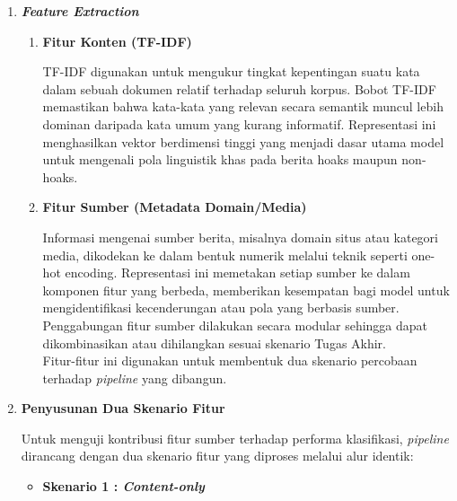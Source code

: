 \begin{enumerate}
\begin{itemize}
        \item \textbf{Stemming}, yang mengembalikan kata ke bentuk dasarnya untuk menyatukan variasi morfologis, misalnya “menyebarkan”, “disebarkan”, dan “penyebaran” menjadi bentuk dasar “sebar”.

        Proses ini bertujuan menghasilkan representasi teks yang bersih dan dapat diproses lebih lanjut oleh model.\\

    \end{itemize}

    \item \textbf{\textit{Feature Extraction}}
        \begin{enumerate}
            \item \textbf{Fitur Konten (TF-IDF)}
            
            TF-IDF digunakan untuk mengukur tingkat kepentingan suatu kata dalam sebuah dokumen relatif terhadap seluruh korpus. Bobot TF-IDF memastikan bahwa kata-kata yang relevan secara semantik muncul lebih dominan daripada kata umum yang kurang informatif. Representasi ini menghasilkan vektor berdimensi tinggi yang menjadi dasar utama model untuk mengenali pola linguistik khas pada berita hoaks maupun non-hoaks.
            
            \item \textbf{Fitur Sumber (Metadata Domain/Media)}
            
            Informasi mengenai sumber berita, misalnya domain situs atau kategori media, dikodekan ke dalam bentuk numerik melalui teknik seperti one-hot encoding. Representasi ini memetakan setiap sumber ke dalam komponen fitur yang berbeda, memberikan kesempatan bagi model untuk mengidentifikasi kecenderungan atau pola yang berbasis sumber. Penggabungan fitur sumber dilakukan secara modular sehingga dapat dikombinasikan atau dihilangkan sesuai skenario Tugas Akhir.\\
            
            Fitur-fitur ini digunakan untuk membentuk dua skenario percobaan terhadap \textit{pipeline} yang dibangun.\\
        \end{enumerate}

    \item \textbf{Penyusunan Dua Skenario Fitur}
    
        Untuk menguji kontribusi fitur sumber terhadap performa klasifikasi, \textit{pipeline} dirancang dengan dua skenario fitur yang diproses melalui alur identik:
        \begin{itemize}
            \item \textbf{Skenario 1 : \textit{Content-only }}
            

\end{itemize}
\end{enumerate}
